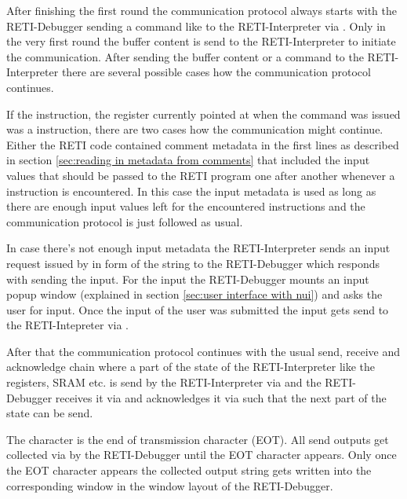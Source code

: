 \documentclass{report}
\begin{document}
After finishing the first round the communication protocol always starts with the RETI-Debugger sending a command like  to the RETI-Interpreter via . Only in the very first round the buffer content is send to the RETI-Interpreter to initiate the communication. After sending the buffer content or a command to the RETI-Interpreter there are several possible cases how the communication protocol continues.

If the instruction, the  register currently pointed at when the  command was issued was a  instruction, there are two cases how the communication might continue. Either the RETI code contained \alert{comment metadata} in the first lines as described in section \ref{sec:reading in metadata from comments} that included the input values that should be passed to the RETI program one after another whenever a  instruction is encountered. In this case the input metadata is used as long as there are enough input values left for the encountered  instructions and the communication protocol is just followed as usual.

In case there's not enough input metadata the RETI-Interpreter sends an input request issued by  in form of the string  to the RETI-Debugger which responds with sending the input. For the input the RETI-Debugger mounts an input popup window (explained in section \ref{sec:user interface with nui}) and asks the user for input. Once the input of the user was submitted the input gets send to the RETI-Intepreter via .

After that the communication protocol continues with the usual send, receive and acknowledge chain where a part of the state of the RETI-Interpreter like the registers, SRAM etc. is send by the RETI-Interpreter via  and the RETI-Debugger receives it via  and acknowledges it via  such that the next part of the state can be send.

The character  is the end of transmission character (\alert{EOT}). All send outputs get collected via  by the RETI-Debugger until the EOT character  appears. Only once the EOT character appears the collected output  string gets written into the corresponding window in the window layout of the RETI-Debugger.
\end{document}
